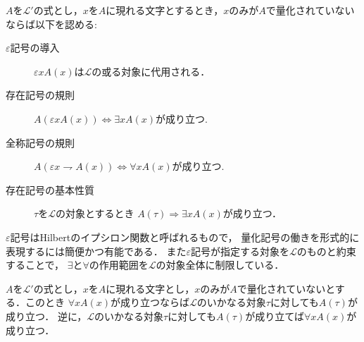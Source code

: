 	
	\begin{screen}
		\begin{logicalaxm}[量化記号に関する規則]\label{logicalaxm:rules_of_quantifiers}
			$A$を$\mathcal{L}'$の式とし，$x$を$A$に現れる文字とするとき，$x$のみが$A$で量化されていないならば以下を認める:
			\begin{description}
				\item[$\varepsilon$記号の導入] $\varepsilon x A(x)$は$\mathcal{L}$の或る対象に代用される．
				\item[存在記号の規則] $A (\varepsilon x A(x)) \Longleftrightarrow \exists x A(x)$が成り立つ.
				\item[全称記号の規則] $A (\varepsilon x \rightharpoondown A(x)) \Longleftrightarrow \forall x A(x)$が成り立つ.
				\item[存在記号の基本性質] $\tau$を$\mathcal{L}$の対象とするとき
					$A(\tau) \Longrightarrow \exists x A(x)$が成り立つ．
			\end{description}
		\end{logicalaxm}
	\end{screen}
	
	$\varepsilon$記号はHilbertのイプシロン関数と呼ばれるもので，
	量化記号の働きを形式的に表現するには簡便かつ有能である．
	また$\varepsilon$記号が指定する対象を$\mathcal{L}$のものと約束することで，
	$\exists$と$\forall$の作用範囲を$\mathcal{L}$の対象全体に制限している．
	
	\begin{screen}
		\begin{logicalthm}[全称記号と任意性]\label{logicalthm:fundamental_law_of_universal_quantifier}
			$A$を$\mathcal{L}'$の式とし，$x$を$A$に現れる文字とし，$x$のみが$A$で量化されていないとする．このとき
			$\forall x A(x)$が成り立つならば$\mathcal{L}$のいかなる対象$\tau$に対しても$ A(\tau)$が成り立つ．
			逆に，$\mathcal{L}$のいかなる対象$\tau$に対しても$A(\tau)$が成り立てば$\forall x A(x)$が成り立つ．
		\end{logicalthm}
	\end{screen}
	
